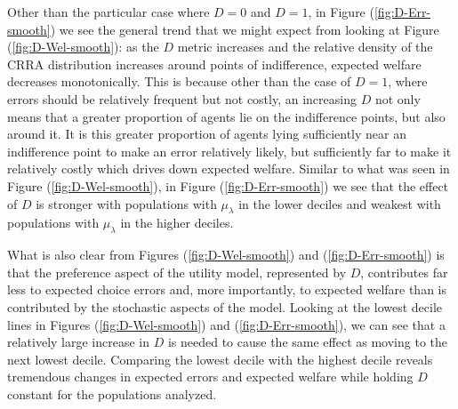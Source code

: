 \documentclass[../main.tex]{subfiles}
\begin{document}
\addtocounter{footnote}{-1}

Other than the particular case where $D=0$ and $D=1$, in Figure (\ref{fig:D-Err-smooth}) we see the general trend that we might expect from looking at Figure (\ref{fig:D-Wel-smooth}): as the $D$ metric increases and the relative density of the CRRA distribution increases around points of indifference, expected welfare decreases monotonically.
This is because other than the case of $D=1$, where errors should be relatively frequent but not costly, an increasing $D$ not only means that a greater proportion of agents lie on the indifference points, but also around it.
It is this greater proportion of agents lying sufficiently near an indifference point to make an error relatively likely, but sufficiently far to make it relatively costly which drives down expected welfare.
Similar to what was seen in Figure (\ref{fig:D-Wel-smooth}), in Figure (\ref{fig:D-Err-smooth}) we see that the effect of $D$ is stronger with populations with $\mu_\lambda$ in the lower deciles and weakest with populations with $\mu_\lambda$ in the higher deciles.

What is also clear from Figures (\ref{fig:D-Wel-smooth}) and (\ref{fig:D-Err-smooth}) is that the preference aspect of the utility model, represented by $D$, contributes far less to expected choice errors and, more importantly, to expected welfare than is contributed by the stochastic aspects of the model.
Looking at the lowest decile lines in Figures (\ref{fig:D-Wel-smooth}) and (\ref{fig:D-Err-smooth}), we can see that a relatively large increase in $D$ is needed to cause the same effect as moving to the next lowest decile.
Comparing the lowest decile with the highest decile reveals tremendous changes in expected errors and expected welfare while holding $D$ constant for the populations analyzed.
\end{document}
